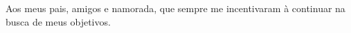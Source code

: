 Aos meus pais, amigos e namorada, que sempre me incentivaram à continuar na busca de meus objetivos. 